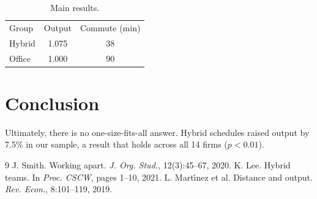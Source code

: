 \documentclass{article}
\begin{document}
\begin{table}[h]
\centering
\begin{tabular}{lcc}
Group & Output & Commute (min) \\
Hybrid & 1.075 & 38 \\
Office & 1.000 & 90 \\
\end{tabular}
\caption{Main results.}
\end{table}

\section{Conclusion}
Ultimately, there is no one-size-fits-all answer. Hybrid schedules raised output by
7.5\% in our sample, a result that holds across all 14 firms ($p < 0.01$).

\begin{thebibliography}{9}
 J. Smith. Working apart. \emph{J. Org. Stud.}, 12(3):45--67, 2020.
 K. Lee. Hybrid teams. In \emph{Proc. CSCW}, pages 1--10, 2021.
 L. Mart\'{\i}nez et al. Distance and output. \emph{Rev. Econ.}, 8:101--119, 2019.
\end{thebibliography}
\end{document}
